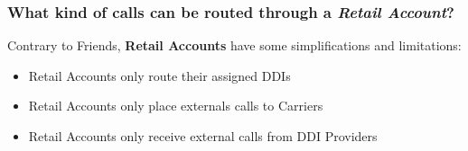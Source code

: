 \documentclass[letterpaper,10pt,spanish]{sphinxmanual}
\begin{document}
\subsubsection{What kind of calls can be routed through a \emph{Retail Account}?}
\label{administration_portal/client/retail/retail_accounts:what-kind-of-calls-can-be-routed-through-a-retail-account}
Contrary to Friends, \textbf{Retail Accounts} have some simplifications and limitations:
\begin{itemize}
\item {} 
Retail Accounts only route their assigned DDIs

\item {} 
Retail Accounts only place externals calls to Carriers

\item {} 
Retail Accounts only receive external calls from DDI Providers

\end{itemize}
\end{document}
